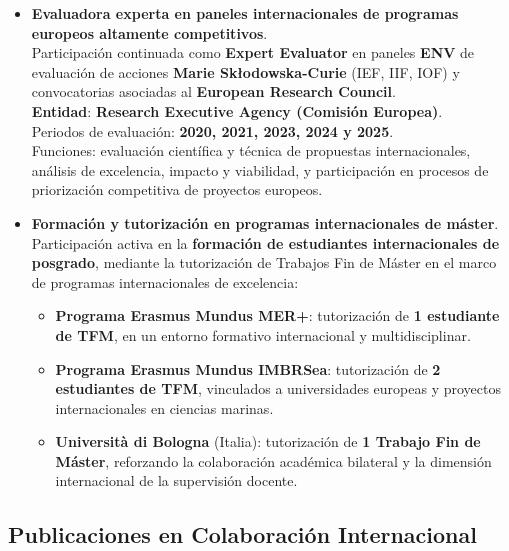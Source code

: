 \documentclass[11pt,a4paper]{article}
\begin{document}
\begin{itemize}[leftmargin=*]
    
    \item \textbf{Evaluadora experta en paneles internacionales de programas europeos altamente competitivos}.\\
    Participación continuada como \textbf{Expert Evaluator} en paneles \textbf{ENV} de evaluación de acciones \textbf{Marie Skłodowska-Curie} (IEF, IIF, IOF) y convocatorias asociadas al \textbf{European Research Council}.\\
    \textbf{Entidad}: \textbf{Research Executive Agency (Comisión Europea)}.\\
    Periodos de evaluación: \textbf{2020, 2021, 2023, 2024 y 2025}.\\
    Funciones: evaluación científica y técnica de propuestas internacionales, análisis de excelencia, impacto y viabilidad, y participación en procesos de priorización competitiva de proyectos europeos.


    \item \textbf{Formación y tutorización en programas internacionales de máster}.\\
    Participación activa en la \textbf{formación de estudiantes internacionales de posgrado}, mediante la tutorización de Trabajos Fin de Máster en el marco de programas internacionales de excelencia:
    \begin{itemize}
        \item \textbf{Programa Erasmus Mundus MER+}: tutorización de \textbf{1 estudiante de TFM}, en un entorno formativo internacional y multidisciplinar.
        \item \textbf{Programa Erasmus Mundus IMBRSea}: tutorización de \textbf{2 estudiantes de TFM}, vinculados a universidades europeas y proyectos internacionales en ciencias marinas.
        \item \textbf{Università di Bologna} (Italia): tutorización de \textbf{1 Trabajo Fin de Máster}, reforzando la colaboración académica bilateral y la dimensión internacional de la supervisión docente.
    \end{itemize}

\end{itemize}
\subsection{Publicaciones en Colaboración Internacional}
\end{document}
